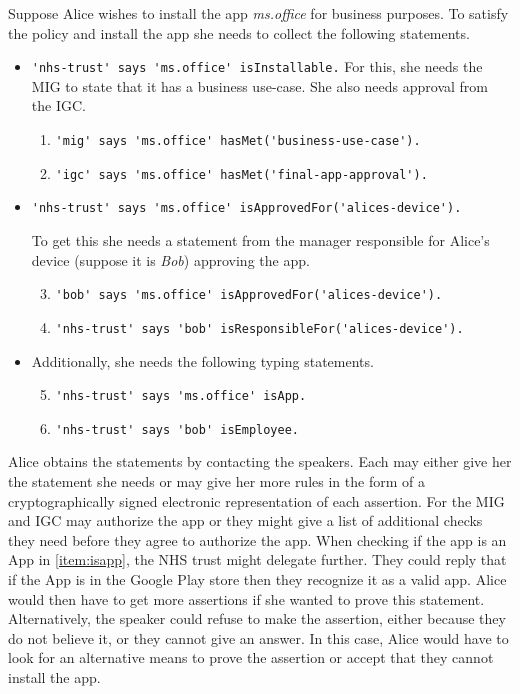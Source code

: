 \documentclass[thesis.tex]{subfiles}
\begin{document}
Suppose Alice wishes to install the app \emph{\ttfamily ms.office} for
business purposes.  To satisfy the policy and install the app she
needs to collect the following statements.

\begin{itemize}
  \item \lstinline!'nhs-trust' says 'ms.office' isInstallable.!
    For this, she needs the \ac{MIG} to state that it has a business use-case.
    She also needs approval from the \ac{IGC}.
    \begin{enumerate}\setcounter{enumi}{0}
      \item \lstinline!'mig' says 'ms.office' hasMet('business-use-case').!
      \item \lstinline!'igc' says 'ms.office' hasMet('final-app-approval').!
    \end{enumerate}
  \item \lstinline!'nhs-trust' says 'ms.office' isApprovedFor('alices-device').!

    To get this she needs a statement from the manager responsible for Alice's device (suppose it is \emph{Bob}) approving the app.
    \begin{enumerate}\setcounter{enumi}{2}
      \item \lstinline!'bob' says 'ms.office' isApprovedFor('alices-device').!
      \item \lstinline!'nhs-trust' says 'bob' isResponsibleFor('alices-device').!
    \end{enumerate}
  \item Additionally, she needs the following typing statements.
    \begin{enumerate}\setcounter{enumi}{4}
      \item \lstinline!'nhs-trust' says 'ms.office' isApp.! \label{item:isapp}
      \item \lstinline!'nhs-trust' says 'bob' isEmployee.!
    \end{enumerate}
\end{itemize}

\noindent Alice obtains the statements by contacting the speakers. Each may either give
her the statement she needs or may give her more rules in the form of a
cryptographically signed electronic representation of each assertion. For
the \ac{MIG} and \ac{IGC} may authorize the app or they might give a
list of additional checks they need before they agree to authorize the app. When
checking if the app is an App in \autoref{item:isapp}, the NHS trust might
delegate further. They could reply that if the App is in the Google Play store
then they recognize it as a valid app. Alice would then have to get more
assertions if she wanted to prove this statement. Alternatively, the speaker
could refuse to make the assertion, either because they do not believe it, or
they cannot give an answer. In this case, Alice would have to look for an
alternative means to prove the assertion or accept that they cannot install the
app.
\end{document}
